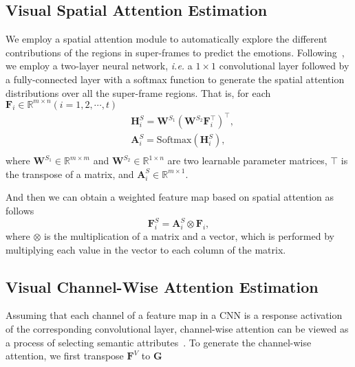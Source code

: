 \documentclass[letterpaper]{article} \usepackage{aaai20}  \usepackage{times}  \usepackage{helvet} \usepackage{courier}  \usepackage[hyphens]{url}  \usepackage{graphicx} \urlstyle{rm} \def\UrlFont{\rm}  \usepackage{graphicx}
\begin{document}
\subsection{Visual Spatial Attention Estimation}
\label{ssec:Spatial}
We employ a spatial attention module to automatically explore the different contributions of the regions in super-frames to predict the emotions. Following~\cite{chen2017sca}, we employ a two-layer neural network, \textit{i.e.} a $1\times 1$ convolutional layer followed by a fully-connected layer with a softmax function to generate the spatial attention distributions over all the super-frame regions. That is, for each ${\textbf{F}_i \in \mathbb{R}^{ m \times n}}(i = 1,2, \cdots ,t)$
\begin{equation}\begin{aligned}
&{\textbf{H}_i^S} = {{\textbf{W}^{S_1}}({\textbf{W}^{S_2}}{\textbf{F}_i^ \top})^ \top },\\
&\textbf{A}_i^S=\text{Softmax}(\textbf{H}_i^S),\\
\end{aligned}
\label{equ:spatial}
\end{equation}
where $\textbf{W}^{S_1}\in\mathbb{R}^{m\times m}$ and $\textbf{W}^{S_2}\in\mathbb{R}^{1\times n}$ are two learnable parameter matrices, $\top$ is the transpose of a matrix, and $\textbf{A}_i^S \in \mathbb{R}^{ m \times 1}$.

And then we can obtain a weighted feature map based on spatial attention as follows
\begin{equation}\textbf{F}_i^S=\textbf{A}_{i}^S\otimes\textbf{F}_{i},
\end{equation}
where $\otimes$ is the multiplication of a matrix and a vector, which is performed by multiplying each value in the vector to each column of the matrix.



\subsection{Visual Channel-Wise Attention Estimation}
\label{ssec:ChannelWise}
Assuming that each channel of a feature map in a CNN is a response activation of the corresponding convolutional layer, channel-wise attention can be viewed as a process of selecting semantic attributes~\cite{chen2017sca}. To generate the channel-wise attention, we first transpose $\textbf{F}^{V}$ to $\textbf{G}$
\end{document}
